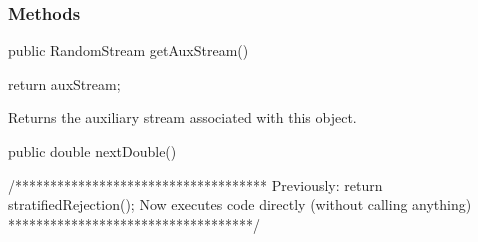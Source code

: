\subsubsection* {Methods}
\begin{code}

   public RandomStream getAuxStream()\begin{hide} {
      return auxStream;
   }\end{hide}
\end{code}
\begin{tabb}   Returns the auxiliary stream associated with this object.
\end{tabb}
\begin{code}\begin{hide}
    
   public double nextDouble() {
      /************************************
      Previously: return stratifiedRejection();
      Now executes code directly (without calling anything)
      ***********************************/

}
\end{hide}
\end{code}
